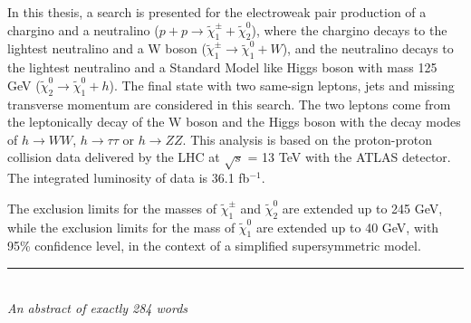 In this thesis, a search is presented for the electroweak pair production of a chargino and a neutralino ($p + p \rightarrow \tilde{\chi}_1^\pm + \tilde{\chi}_2^0$),
where the chargino decays to the lightest neutralino and a W boson ($\tilde{\chi}_1^\pm \rightarrow \tilde{\chi}_1^0 + W$),
and the neutralino decays to the lightest neutralino and a Standard Model like Higgs boson with mass 125 GeV ($\tilde{\chi}_2^0 \rightarrow \tilde{\chi}_1^0 + h$).
The final state with two same-sign leptons, jets and missing transverse momentum are considered in this search.
The two leptons come from the leptonically decay of the W boson and the Higgs boson with the decay modes of  $h \rightarrow WW$, $h \rightarrow \tau \tau$ or $h \rightarrow ZZ$.
This analysis is based on the proton-proton collision data delivered by the LHC at $\sqrt{s}$ = 13 TeV with the ATLAS detector.
The integrated luminosity of data is 36.1 fb$^{-1}$.

The exclusion limits for the masses of $\tilde{\chi}_1^\pm$ and $\tilde{\chi}_2^0$ are extended up to 245 GeV, while the exclusion limits for the mass of $\tilde{\chi}_1^0$ are extended up to 40 GeV, with 95\% confidence level, in the context of a simplified supersymmetric model.

\bigskip

\begin{center}

\rule{6cm}{0.025cm}\\
{\slshape An abstract of exactly 284 words}

\end{center}
